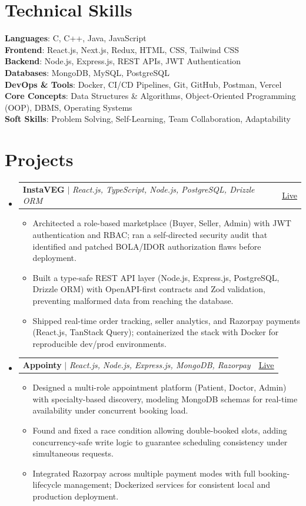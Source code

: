 \documentclass[letterpaper,11pt]{article}
\makeatletter
\newcommand{\resumeItem}[1]{
  \item\small{
    {#1 \vspace{-4pt}}
  }
}
\newcommand{\resumeProjectHeading}[2]{
    \item
    \begin{tabular*}{0.97\textwidth}{l@{\extracolsep{\fill}}r}
      \small#1 & #2 \\
    \end{tabular*}\vspace{-9pt}
}
\newcommand{\resumeSubHeadingListStart}{\begin{itemize}[leftmargin=0.15in, label={}]}
\newcommand{\resumeSubHeadingListEnd}{\end{itemize}}
\newcommand{\resumeItemListStart}{\begin{itemize}[label=$\vcenter{\hbox{\tiny$\bullet$}}$]}
\newcommand{\resumeItemListEnd}{\end{itemize}\vspace{-7pt}}
\makeatother
\begin{document}
  \section{Technical Skills}
 \begin{itemize}[leftmargin=0.15in, label={}]
    \small{\item{
     \textbf{Languages}{: C, C++, Java, JavaScript} \\
     \textbf{Frontend}{: React.js, Next.js, Redux, HTML, CSS, Tailwind CSS} \\
     \textbf{Backend}{: Node.js, Express.js, REST APIs, JWT Authentication} \\
     \textbf{Databases}{: MongoDB, MySQL, PostgreSQL} \\
     \textbf{DevOps \& Tools}{: Docker, CI/CD Pipelines, Git, GitHub, Postman, Vercel} \\
     \textbf{Core Concepts}{: Data Structures \& Algorithms, Object-Oriented Programming (OOP), DBMS, Operating Systems} \\
     \textbf{Soft Skills}{: Problem Solving, Self-Learning, Team Collaboration, Adaptability} \\
    }}
 \end{itemize}


\section{Projects}
\resumeSubHeadingListStart
\resumeProjectHeading
{\textbf{InstaVEG} $|$ \emph{React.js, TypeScript, Node.js, PostgreSQL, Drizzle ORM}}{\href{https://green-mart-connect--mnvj69.replit.app/}{\underline{Live}}}
\resumeItemListStart
\resumeItem{Architected a role-based marketplace (Buyer, Seller, Admin) with JWT authentication and RBAC; ran a self-directed security audit that identified and patched BOLA/IDOR authorization flaws before deployment.}
\resumeItem{Built a type-safe REST API layer (Node.js, Express.js, PostgreSQL, Drizzle ORM) with OpenAPI-first contracts and Zod validation, preventing malformed data from reaching the database.}
\resumeItem{Shipped real-time order tracking, seller analytics, and Razorpay payments (React.js, TanStack Query); containerized the stack with Docker for reproducible dev/prod environments.}
\resumeItemListEnd

\resumeProjectHeading
{\textbf{Appointy} $|$ \emph{React.js, Node.js, Express.js, MongoDB, Razorpay}}{\href{https://appointy-roan.vercel.app/}{\underline{Live}}}
\resumeItemListStart
\resumeItem{Designed a multi-role appointment platform (Patient, Doctor, Admin) with specialty-based discovery, modeling MongoDB schemas for real-time availability under concurrent booking load.}
\resumeItem{Found and fixed a race condition allowing double-booked slots, adding concurrency-safe write logic to guarantee scheduling consistency under simultaneous requests.}
\resumeItem{Integrated Razorpay across multiple payment modes with full booking-lifecycle management; Dockerized services for consistent local and production deployment.}
\resumeItemListEnd
\resumeSubHeadingListEnd
\end{document}
